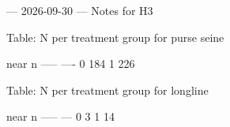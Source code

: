 --- 2026-09-30 ---
Notes for H3


Table: N per treatment group for purse seine
 
  near     n
 -----  ----
     0   184
     1   226


Table: N per treatment group for longline
 
  near    n
 -----  ---
     0    3
     1   14


